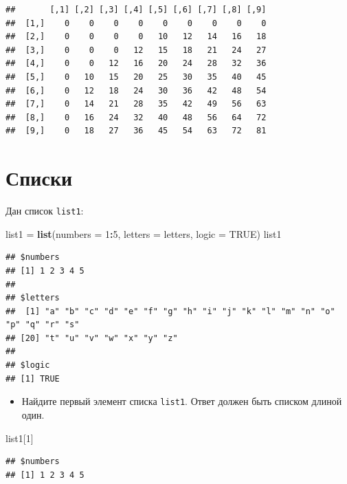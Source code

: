 \documentclass[]{book}
\newenvironment{Shaded}{\begin{snugshade}}{\end{snugshade}}
\newcommand{\KeywordTok}[1]{\textcolor[rgb]{0.13,0.29,0.53}{\textbf{#1}}}
\newcommand{\DataTypeTok}[1]{\textcolor[rgb]{0.13,0.29,0.53}{#1}}
\newcommand{\DecValTok}[1]{\textcolor[rgb]{0.00,0.00,0.81}{#1}}
\newcommand{\StringTok}[1]{\textcolor[rgb]{0.31,0.60,0.02}{#1}}
\newcommand{\OtherTok}[1]{\textcolor[rgb]{0.56,0.35,0.01}{#1}}
\newcommand{\OperatorTok}[1]{\textcolor[rgb]{0.81,0.36,0.00}{\textbf{#1}}}
\newcommand{\NormalTok}[1]{#1}
\providecommand{\tightlist}{%
  \setlength{\itemsep}{0pt}\setlength{\parskip}{0pt}}
\begin{document}
\begin{verbatim}
##       [,1] [,2] [,3] [,4] [,5] [,6] [,7] [,8] [,9]
##  [1,]    0    0    0    0    0    0    0    0    0
##  [2,]    0    0    0    0   10   12   14   16   18
##  [3,]    0    0    0   12   15   18   21   24   27
##  [4,]    0    0   12   16   20   24   28   32   36
##  [5,]    0   10   15   20   25   30   35   40   45
##  [6,]    0   12   18   24   30   36   42   48   54
##  [7,]    0   14   21   28   35   42   49   56   63
##  [8,]    0   16   24   32   40   48   56   64   72
##  [9,]    0   18   27   36   45   54   63   72   81
\end{verbatim}

\section{Списки}\label{solution_list}

Дан список \texttt{list1}:

\begin{Shaded}
\begin{Highlighting}[]
\NormalTok{list1 =}\StringTok{ }\KeywordTok{list}\NormalTok{(}\DataTypeTok{numbers =} \DecValTok{1}\OperatorTok{:}\DecValTok{5}\NormalTok{, }\DataTypeTok{letters =}\NormalTok{ letters, }\DataTypeTok{logic =} \OtherTok{TRUE}\NormalTok{)}
\NormalTok{list1}
\end{Highlighting}
\end{Shaded}

\begin{verbatim}
## $numbers
## [1] 1 2 3 4 5
## 
## $letters
##  [1] "a" "b" "c" "d" "e" "f" "g" "h" "i" "j" "k" "l" "m" "n" "o" "p" "q" "r" "s"
## [20] "t" "u" "v" "w" "x" "y" "z"
## 
## $logic
## [1] TRUE
\end{verbatim}

\begin{itemize}
\tightlist
\item
  Найдите первый элемент списка \texttt{list1}. Ответ должен быть
  списком длиной один.
\end{itemize}

\begin{Shaded}
\begin{Highlighting}[]
\NormalTok{list1[}\DecValTok{1}\NormalTok{]}
\end{Highlighting}
\end{Shaded}

\begin{verbatim}
## $numbers
## [1] 1 2 3 4 5
\end{verbatim}
\end{document}
